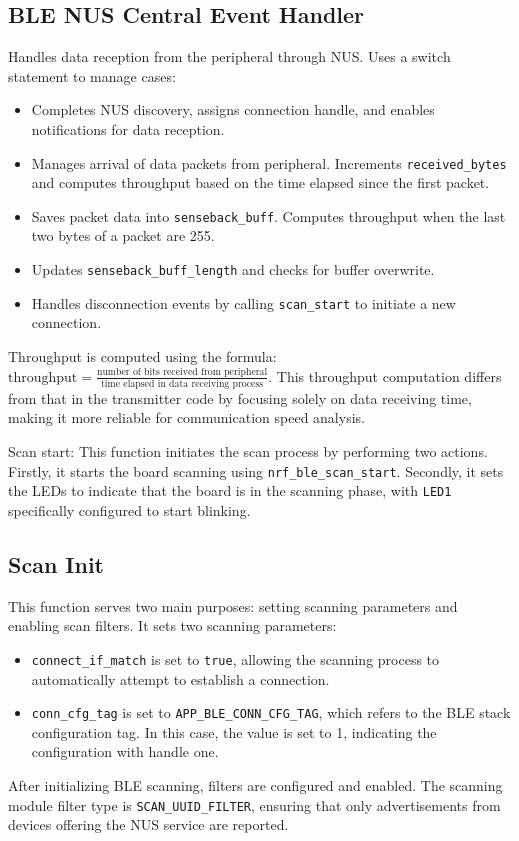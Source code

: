 \documentclass{Configuration_Files/PoliMi3i_thesis}
\begin{document}
\subsection*{BLE NUS Central Event Handler}
Handles data reception from the peripheral through NUS. Uses a switch statement to manage cases:
\begin{itemize}
    \item Completes NUS discovery, assigns connection handle, and enables notifications for data reception.
    \item Manages arrival of data packets from peripheral. Increments \texttt{received\_bytes} and computes throughput based on the time elapsed since the first packet.
    \item Saves packet data into \texttt{senseback\_buff}. Computes throughput when the last two bytes of a packet are 255.
    \item Updates \texttt{senseback\_buff\_length} and checks for buffer overwrite.
    \item Handles disconnection events by calling \texttt{scan\_start} to initiate a new connection.
\end{itemize}
Throughput is computed using the formula: \(\text{throughput} = \frac{\text{number of bits received from peripheral}}{\text{time elapsed in data receiving process}}\). This throughput computation differs from that in the transmitter code by focusing solely on data receiving time, making it more reliable for communication speed analysis.





Scan start: This function initiates the scan process by performing two actions. Firstly, it starts the board scanning using \texttt{nrf\_ble\_scan\_start}. Secondly, it sets the LEDs to indicate that the board is in the scanning phase, with \texttt{LED1} specifically configured to start blinking.

\subsection*{Scan Init}
This function serves two main purposes: setting scanning parameters and enabling scan filters. It sets two scanning parameters:
\begin{itemize}
    \item \texttt{connect\_if\_match} is set to \texttt{true}, allowing the scanning process to automatically attempt to establish a connection.
    \item \texttt{conn\_cfg\_tag} is set to \texttt{APP\_BLE\_CONN\_CFG\_TAG}, which refers to the BLE stack configuration tag. In this case, the value is set to 1, indicating the configuration with handle one.
\end{itemize}
After initializing BLE scanning, filters are configured and enabled. The scanning module filter type is \texttt{SCAN\_UUID\_FILTER}, ensuring that only advertisements from devices offering the NUS service are reported.
\end{document}

